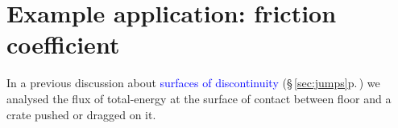 \documentclass[a4paper,12pt,%
onecolumn,oneside,%
british%
]{memoir}
\newcommand*{\amp}{\&}
\newcommand{\mynotew}[1]{{\footnotesize\color{midgrey}\faIcon{tools}\ #1}}
\renewcommand*{\|}[1][]{\nonscript\:#1\vert\nonscript\:\mathopen{}}
\newcommand*{\sect}{\S}%
\renewcommand*{\autoref}[3][\sect\,\ref]{\textcolor{blue}{#3} {\color{blue}\scriptsize(\faIcon[regular]{eye}\;#1{#2}\;p.\,\pageref{#2})}}
\begin{document}
\section{Example application: friction coefficient}
\label{sec:friction_entropy}

In a previous discussion about \autoref{sec:jumps}{surfaces of discontinuity} we analysed the flux of total-energy at the surface of contact between floor and a crate pushed or dragged on it.





%
%
%
%

\end{document}
